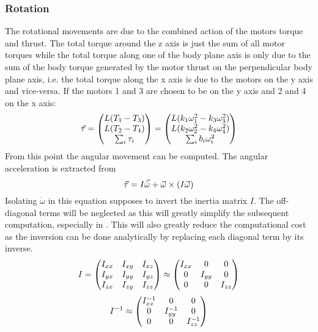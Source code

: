 \subsubsection{Rotation} 
The rotational movements are due to the combined action of the motors torque and thrust. The total torque around the z
axis is just the sum of all motor torques while the total torque along one of the body plane axis is only due to
the sum of the body torque generated by the motor thrust on the perpendicular body plane axis, i.e. the
total torque along the x axis is due to the motors on the y axis and vice-versa. If the motors 1 and 3 are chosen to be
on the y axis and 2 and 4 on the x axis:
\begin{equation}
	\vec{\tau} = \begin{pmatrix}
	L(T_1-T_3)\\
	L(T_2-T_4)\\
	\sum_{i}{\tau_i}
	\end{pmatrix} = \begin{pmatrix}
	L(k_1\omega_1^2 - k_3\omega_3^2)\\
	L(k_2\omega_2^2 - k_4\omega_4^2)\\
	\sum_{i}{b_i \omega_i^2}
	\end{pmatrix}
\end{equation}
From this point the angular movement can be computed. The angular acceleration is extracted from
\begin{equation}
	\vec{\tau} = I\vec{\dot{\omega}} + \vec{\omega}\times(I\vec{\omega})
\end{equation}
Isolating $\dot{\omega}$ in this equation supposes to invert the inertia matrix $I$. The off-diagonal terms will be
neglected as this will greatly simplify the subsequent computation, especially in . This will also
greatly reduce the computational cost as the inversion can be done analytically by replacing each diagonal term by its
inverse.
\begin{equation}
	I = \begin{pmatrix}
	I_{xx} & I_{xy} & I_{xz}\\
	I_{yx} & I_{yy} & I_{yz}\\
	I_{zx} & I_{zy} & I_{zz}\\ 
	\end{pmatrix} \approx \begin{pmatrix}
	I_{xx} 	& 0 		& 0\\
	0 		& I_{yy} 	& 0\\
	0 		& 0 		& I_{zz}\\ 	
	\end{pmatrix}
\end{equation}
\begin{equation}
	I^{-1} \approx \begin{pmatrix}
	I_{xx}^{-1} & 0 			& 0\\
	0 			& I_{yy}^{-1} 	& 0\\
	0 			& 0 			& I_{zz}^{-1}\\ 		
	\end{pmatrix}
\end{equation}

